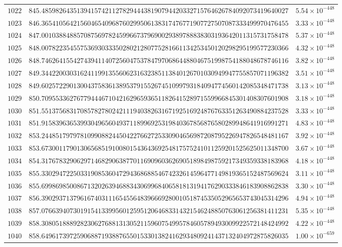 \documentclass[12pt,reqno]{amsart}
\theoremstyle{remark}
\begin{document}
\begin{longtable}{clc}
$1022$ & $845.4859826435139415742112782944438190794420332715764626784092073419640027$ & $5.54\times 10^{-448}$ \\
$1023$ & $846.3654105642156046540968760299506138317476771907727507087333499970476455$ & $3.33\times 10^{-448}$ \\
$1024$ & $847.0010388488570875697824599667379690029389788838303193642011315731758478$ & $5.37\times 10^{-448}$ \\
$1025$ & $848.0078223545575369303335028021280775281661134253450120298295199577230366$ & $4.32\times 10^{-448}$ \\
$1026$ & $848.7462641554274394114072560475378479706864488046751998754188048678746116$ & $3.82\times 10^{-448}$ \\
$1027$ & $849.3442200303162411991355606231632385113840126701030949947755857071196382$ & $3.51\times 10^{-448}$ \\
$1028$ & $849.6025722901300437583613895379155267451099793184094774560142085348471738$ & $3.13\times 10^{-448}$ \\
$1029$ & $850.7095533627677944467104216296593651182641528971559966845301408307601908$ & $3.18\times 10^{-448}$ \\
$1030$ & $851.5513756831708578278024211194038263167192516924876763351263490884237528$ & $3.33\times 10^{-448}$ \\
$1031$ & $851.9158396365399304965604937118996925319840367856876580289948641916991271$ & $4.83\times 10^{-448}$ \\
$1032$ & $853.2448517979781099088244504227662725330904656987208795226947826548481167$ & $3.92\times 10^{-448}$ \\
$1033$ & $853.6730011790130656851910080154364369254817575241011259201525625011348700$ & $3.67\times 10^{-448}$ \\
$1034$ & $854.3176783290629714682906387701169096036269051898498759217349359338183968$ & $4.18\times 10^{-448}$ \\
$1035$ & $855.3302947225033190853604729436868854674232614596477149819365152487569624$ & $3.11\times 10^{-448}$ \\
$1036$ & $855.6998698500867132026394688343069968406581813194176290333846183908862838$ & $3.30\times 10^{-448}$ \\
$1037$ & $856.3902937137961674031116545564839666928001051874535052965653743045314296$ & $4.94\times 10^{-448}$ \\
$1038$ & $857.0766394073019154133995601259512064683314321546248850763061256381411231$ & $5.35\times 10^{-448}$ \\
$1039$ & $858.3080518889282306276881313052115960754995784605789493009922572148424992$ & $4.22\times 10^{-448}$ \\
$1040$ & $858.6496173972590688719388765501533013824162934809241437132404972875826035$ & $1.00\times 10^{-659}$ \\
\end{longtable}
\normalsize
\setlength{\LTleft}{0pt}
\setlength{\LTright}{0pt}
\end{document}
